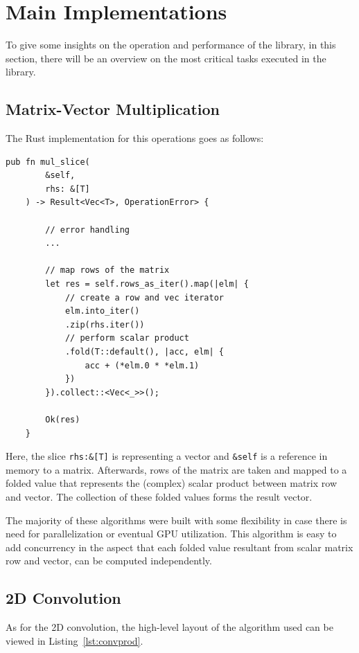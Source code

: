 \section{Main Implementations}
To give some insights on the operation and performance of the library, in this section, there will be an overview on the most critical tasks executed in the library.

\subsection{Matrix-Vector Multiplication}

The Rust implementation for this operations goes as follows:

\begin{lstlisting}[caption=Onverview on the Matrix-Vector multiplication implemented in the Renplex Library using Rust.]
	pub fn mul_slice(
		&self, 
		rhs: &[T]
	) -> Result<Vec<T>, OperationError> {
		
		// error handling
		...
		
		// map rows of the matrix
		let res = self.rows_as_iter().map(|elm| {
			// create a row and vec iterator
			elm.into_iter()
			.zip(rhs.iter())
			// perform scalar product
			.fold(T::default(), |acc, elm| { 
				acc + (*elm.0 * *elm.1) 
			})
		}).collect::<Vec<_>>();
		
		Ok(res)
	}
\end{lstlisting}

Here, the slice \texttt{rhs:\&[T]}  is representing a vector and \texttt{\&self} is a reference in memory to a matrix. Afterwards, rows of the matrix are taken and mapped to a folded value that represents the (complex) scalar product between matrix row and vector. The collection of these folded values forms the result vector.

The majority of these algorithms were built with some flexibility in case there is need for parallelization or eventual GPU utilization. This algorithm is easy to add concurrency  in the aspect that each folded value resultant from scalar matrix row and vector, can be computed independently.

\subsection{2D Convolution}
\label{sec:2Dconv}

As for the 2D convolution, the high-level layout of the algorithm used can be viewed in Listing~\ref{lst:convprod}.

